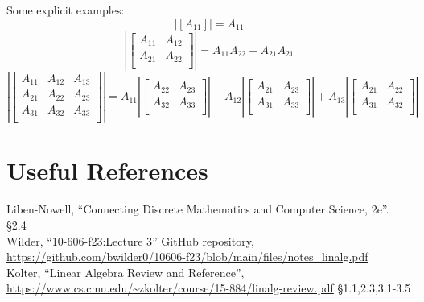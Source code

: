 Some explicit examples:
\[\left|\left[A_{11}\right]\right| = A_{11}\]
\[\left|\left[\begin{matrix}A_{11} & A_{12}\\ A_{21} & A_{22}\\\end{matrix}\right]\right| = A_{11}A_{22}-A_{21}A_{21}\]
\[\left|\left[\begin{matrix}A_{11} & A_{12} & A_{13}\\ A_{21} & A_{22} & A_{23}\\ A_{31} & A_{32} & A_{33}\\\end{matrix}\right]\right| = A_{11}\left|\left[\begin{matrix}A_{22} & A_{23}\\ A_{32} & A_{33}\\\end{matrix}\right]\right|-A_{12}\left|\left[\begin{matrix}A_{21} & A_{23}\\ A_{31} & A_{33}\\\end{matrix}\right]\right|+A_{13}\left|\left[\begin{matrix}A_{21} & A_{22}\\ A_{31} & A_{32}\\\end{matrix}\right]\right|\]


\section*{Useful References}
Liben-Nowell, ``Connecting Discrete Mathematics and Computer Science, 2e''. \S 2.4\\
Wilder, ``10-606-f23:Lecture 3'' GitHub repository, \url{https://github.com/bwilder0/10606-f23/blob/main/files/notes_linalg.pdf}\\
Kolter, ``Linear Algebra Review and Reference'', \url{https://www.cs.cmu.edu/~zkolter/course/15-884/linalg-review.pdf} \S1.1,2.3,3.1-3.5

